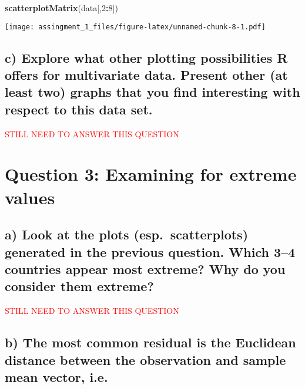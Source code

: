 \documentclass[]{article}
\newenvironment{Shaded}{\begin{snugshade}}{\end{snugshade}}
\newcommand{\DecValTok}[1]{\textcolor[rgb]{0.00,0.00,0.81}{#1}}
\newcommand{\KeywordTok}[1]{\textcolor[rgb]{0.13,0.29,0.53}{\textbf{#1}}}
\newcommand{\NormalTok}[1]{#1}
\newcommand{\OperatorTok}[1]{\textcolor[rgb]{0.81,0.36,0.00}{\textbf{#1}}}
\begin{document}
\begin{Shaded}
\begin{Highlighting}[]
\KeywordTok{scatterplotMatrix}\NormalTok{(data[,}\DecValTok{2}\OperatorTok{:}\DecValTok{8}\NormalTok{])}
\end{Highlighting}
\end{Shaded}

\texttt{[image: assingment\_1\_files/figure-latex/unnamed-chunk-8-1.pdf]}

\hypertarget{c-explore-what-other-plotting-possibilities-r-offers-for-multivariate-data.-present-other-at-least-two-graphs-that-you-find-interesting-with-respect-to-this-data-set.}{%
\subsection{c) Explore what other plotting possibilities R offers for
multivariate data. Present other (at least two) graphs that you find
interesting with respect to this data
set.}\label{c-explore-what-other-plotting-possibilities-r-offers-for-multivariate-data.-present-other-at-least-two-graphs-that-you-find-interesting-with-respect-to-this-data-set.}}

\textcolor{red}{STILL NEED TO ANSWER THIS QUESTION}

\hypertarget{question-3-examining-for-extreme-values}{%
\section{Question 3: Examining for extreme
values}\label{question-3-examining-for-extreme-values}}

\hypertarget{a-look-at-the-plots-esp.-scatterplots-generated-in-the-previous-question.-which-34-countries-appear-most-extreme-why-do-you-consider-them-extreme}{%
\subsection{a) Look at the plots (esp.~scatterplots) generated in the
previous question. Which 3--4 countries appear most extreme? Why do you
consider them
extreme?}\label{a-look-at-the-plots-esp.-scatterplots-generated-in-the-previous-question.-which-34-countries-appear-most-extreme-why-do-you-consider-them-extreme}}

\textcolor{red}{STILL NEED TO ANSWER THIS QUESTION}

\hypertarget{b-the-most-common-residual-is-the-euclidean-distance-between-the-observation-and-sample-mean-vector-i.e.}{%
\subsection{b) The most common residual is the Euclidean distance
between the observation and sample mean vector,
i.e.}\label{b-the-most-common-residual-is-the-euclidean-distance-between-the-observation-and-sample-mean-vector-i.e.}}
\end{document}
